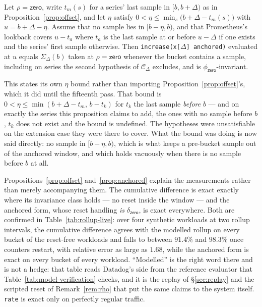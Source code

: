 \iffull\fi

\begin{proposition}\label{prop:anchored}
Let $\rho=\mathsf{zero}$, write $t_m(s)$ for a series' last sample in $[b,b+\Delta)$ as
in Proposition~\ref{prop:offset}, and let $\eta$ satisfy
$0<\eta\le\min_s\big(b+\Delta-t_m(s)\big)$ with
$u=b+\Delta-\eta$. Assume that no sample lies in $[b-\eta,b)$, and that Prometheus's
lookback covers $u-t_a$ where $t_a$ is the last sample at or before $u-\Delta$ if one
exists and the series' first sample otherwise. Then
\texttt{increase(x[$\Delta$] anchored)} evaluated at $u$ equals
$\Sigma_\Delta(b)$ taken at $\rho=\mathsf{zero}$ whenever the bucket contains a sample, including on
series the second hypothesis of $\mathcal{C}_\Delta$ excludes, and is
$\phi_{\mathsf{zero}}$-invariant.

This states its own $\eta$ bound rather than importing
Proposition~\ref{prop:offset}'s, which it did until the fifteenth pass. That bound is
$0<\eta\le\min(b+\Delta-t_m,\,b-t_k)$ for $t_k$ the last sample \emph{before} $b$ --- and
on exactly the series this proposition claims to add, the ones with no sample before $b$,
$t_k$ does not exist and the bound is undefined. The hypotheses were unsatisfiable on the
extension case they were there to cover. What the bound was doing is now said directly:
no sample in $[b-\eta,b)$, which is what keeps a pre-bucket sample out of the anchored
window, and which holds vacuously when there is no sample before $b$ at all.
\end{proposition}
\iffull\fi

\iffull\fi

\noindent
Propositions~\ref{prop:offset} and~\ref{prop:anchored} explain the measurements rather
than merely accompanying them. The cumulative difference is exact exactly where its
invariance class holds --- no reset inside the window --- and the anchored form, whose
reset handling \emph{is} $\delta_{\mathsf{zero}}$, is exact everywhere. Both are
confirmed in Table~\ref{tab:rollup-live}: over four synthetic workloads at two rollup
intervals, the cumulative difference agrees with the modelled rollup on every bucket of
the reset-free workloads and falls to between $91.4\%$ and $98.3\%$ once counters
restart, with relative
error as large as $1.68$, while the anchored form is exact on every bucket of every
workload. ``Modelled'' is the right word there and is not a hedge: that table reads
Datadog's side from the reference evaluator that Table~\ref{tab:model-verification}
checks, and it is the replay of \S\ref{sec:replay} and the scripted reset of Remark~\ref{rem:rho} that put the same
claims to the system itself. \texttt{rate} is exact only on perfectly regular traffic.

